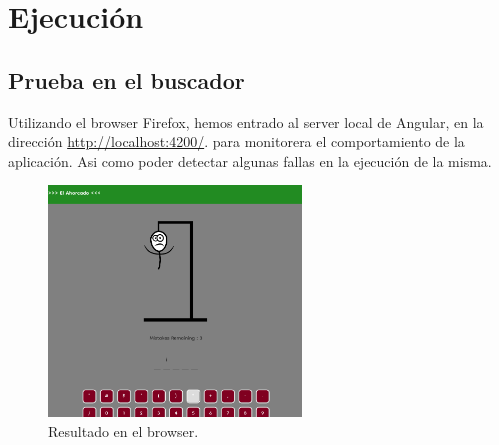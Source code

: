 \section{Ejecución}

\subsection{Prueba en el buscador}

Utilizando el browser Firefox, hemos entrado al server local de Angular, en la dirección \url{http://localhost:4200/}.
para monitorera el comportamiento de la aplicación. Asi como poder detectar algunas fallas en la ejecución de la misma.

\begin{figure}[h]
  \centering
  \includegraphics[width=0.6\textwidth]{../img/resultado.png}  %
  \caption{Resultado en el browser.}
\end{figure}


